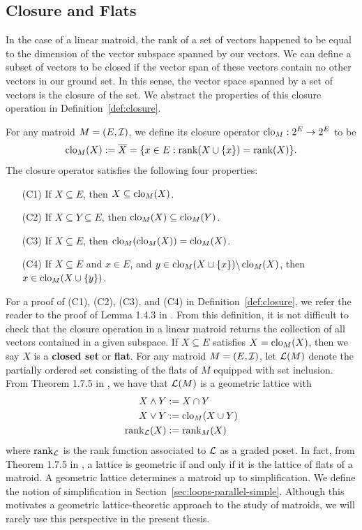 \documentclass{puthesis-UG}
\begin{document}
\subsection{Closure and Flats}

In the case of a linear matroid, the rank of a set of vectors happened to be equal to the dimension of the vector subspace spanned by our vectors. We can define a subset of vectors to be closed if the vector span of these vectors contain no other vectors in our ground set. In this sense, the vector space spanned by a set of vectors is the closure of the set. We abstract the properties of this closure operation in Definition~\ref{def:closure}. 

\begin{defn} \label{def:closure}
	For any matroid $M = (E, \mathcal{I})$, we define its closure operator $\operatorname{clo}_M : 2^E \to 2^E$ to be 
	\[
		\operatorname{clo}_M (X) := \overline{X} = \{x \in E : \operatorname{rank} (X \cup \{x\}) = \operatorname{rank} (X) \}.
	\]
	The closure operator satisfies the following four properties:
	\begin{enumerate}
		\item[(C1)] If $X \subseteq E$, then $X \subseteq \operatorname{clo}_M (X)$. 
		\item[(C2)] If $X \subseteq Y \subseteq E$, then $\operatorname{clo}_M (X) \subseteq \operatorname{clo}_M (Y)$. 
		\item[(C3)] If $X \subseteq E$, then $\operatorname{clo}_M (\operatorname{clo}_M(X)) = \operatorname{clo}_M(X)$. 
		\item[(C4)] If $X \subseteq E$ and $x \in E$, and $y \in \operatorname{clo}_M(X \cup \{x\}) \backslash \operatorname{clo}_M(X)$, then $x \in \operatorname{clo}_M(X \cup \{y\})$. 
	\end{enumerate}
\end{defn}

For a proof of (C1), (C2), (C3), and (C4) in Definition~\ref{def:closure}, we refer the reader to the proof of Lemma 1.4.3 in \cite{10.5555/1197093}. From this definition, it is not difficult to check that the closure operation in a linear matroid returns the collection of all vectors contained in a given subspace. If $X \subseteq E$ satisfies $X = \operatorname{clo}_M(X)$, then we say $X$ is a \textbf{closed set} or \textbf{flat}. For any matroid $M = (E, \mathcal{I})$, let $\mathcal{L}(M)$ denote the partially ordered set consisting of the flats of $M$ equipped with set inclusion. From Theorem 1.7.5 in \cite{10.5555/1197093}, we have that $\mathcal{L}(M)$ is a geometric lattice with 
\begin{align*}
	X \wedge Y & := X \cap Y \\
	X \vee Y & := \operatorname{clo}_M(X \cup Y) \\
	\operatorname{rank}_{\mathcal{L}} (X) & := \operatorname{rank}_M(X)
\end{align*}
where $\operatorname{rank}_{\mathcal{L}}$ is the rank function associated to $\mathcal{L}$ as a graded poset. In fact, from Theorem 1.7.5 in \cite{10.5555/1197093}, a lattice is geometric if and only if it is the lattice of flats of a matroid. A geometric lattice determines a matroid up to simplification. We define the notion of simplification in Section~\ref{sec:loops-parallel-simple}. Although this motivates a geometric lattice-theoretic approach to the study of matroids, we will rarely use this perspective in the present thesis.  
\end{document}

